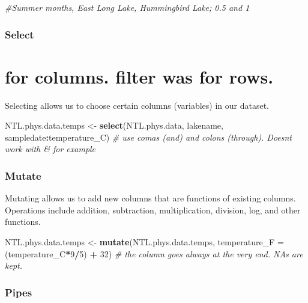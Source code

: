 \documentclass[]{article}
\newenvironment{Shaded}{\begin{snugshade}}{\end{snugshade}}
\newcommand{\KeywordTok}[1]{\textcolor[rgb]{0.13,0.29,0.53}{\textbf{#1}}}
\newcommand{\DataTypeTok}[1]{\textcolor[rgb]{0.13,0.29,0.53}{#1}}
\newcommand{\DecValTok}[1]{\textcolor[rgb]{0.00,0.00,0.81}{#1}}
\newcommand{\StringTok}[1]{\textcolor[rgb]{0.31,0.60,0.02}{#1}}
\newcommand{\CommentTok}[1]{\textcolor[rgb]{0.56,0.35,0.01}{\textit{#1}}}
\newcommand{\OperatorTok}[1]{\textcolor[rgb]{0.81,0.36,0.00}{\textbf{#1}}}
\newcommand{\NormalTok}[1]{#1}
\begin{document}
\begin{Shaded}
\begin{Highlighting}[]
\CommentTok{#Summer months, East Long Lake, Hummingbird Lake; 0.5 and 1}
\end{Highlighting}
\end{Shaded}

\subsubsection{Select}\label{select}

\section{for columns. filter was for
rows.}\label{for-columns.-filter-was-for-rows.}

Selecting allows us to choose certain columns (variables) in our
dataset.

\begin{Shaded}
\begin{Highlighting}[]
\NormalTok{NTL.phys.data.temps <-}\StringTok{ }\KeywordTok{select}\NormalTok{(NTL.phys.data, lakename, sampledate}\OperatorTok{:}\NormalTok{temperature_C) }\CommentTok{# use comas (and) and colons (through). Doesnt work with & for example}
\end{Highlighting}
\end{Shaded}

\subsubsection{Mutate}\label{mutate}

Mutating allows us to add new columns that are functions of existing
columns. Operations include addition, subtraction, multiplication,
division, log, and other functions.

\begin{Shaded}
\begin{Highlighting}[]
\NormalTok{NTL.phys.data.temps <-}\StringTok{ }\KeywordTok{mutate}\NormalTok{(NTL.phys.data.temps, }\DataTypeTok{temperature_F =}\NormalTok{ (temperature_C}\OperatorTok{*}\DecValTok{9}\OperatorTok{/}\DecValTok{5}\NormalTok{) }\OperatorTok{+}\StringTok{ }\DecValTok{32}\NormalTok{)}
\CommentTok{# the column goes always at the very end. NAs are kept.}
\end{Highlighting}
\end{Shaded}

\subsubsection{Pipes}\label{pipes}
\end{document}

